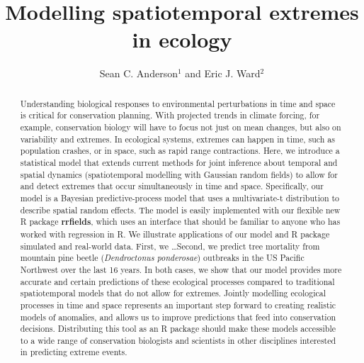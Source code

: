 \documentclass[12pt,english]{article}
\title{Modelling spatiotemporal extremes in ecology}
\author{
Sean C. Anderson$^1$ and
Eric J. Ward$^2$
}
\date{}
\begin{document}
\maketitle

\begin{spacing}{1.25}


\begin{abstract}

Understanding biological responses to environmental perturbations in time and
space is critical for conservation planning. With projected trends in climate
forcing, for example, conservation biology will have to focus not just on mean
changes, but also on variability and extremes. In ecological systems, extremes
can happen in time, such as population crashes, or in space, such as rapid
range contractions. Here, we introduce a statistical model that extends current
methods for joint inference about temporal and spatial dynamics (spatiotemporal
modelling with Gaussian random fields) to allow for and detect extremes that
occur simultaneously in time and space. Specifically, our model is a Bayesian
predictive-process model that uses a multivariate-t distribution to describe
spatial random effects. The model is easily implemented with our flexible new R
package \textbf{rrfields}, which uses an interface that should be familiar to
anyone who has worked with regression in R. We illustrate applications of our
model and R package simulated and real-world data. First, we \ldots Second, we
predict tree mortality from mountain pine beetle (\emph{Dendroctonus
  ponderosae}) outbreaks in the US Pacific Northwest over the last 16 years. In
both cases, we show that our model provides more accurate and certain
predictions of these ecological processes compared to traditional
spatiotemporal models that do not allow for extremes. Jointly modelling
ecological processes in time and space represents an important step forward to
creating realistic models of anomalies, and allows us to improve predictions
that feed into conservation decisions. Distributing this tool as an R package
should make these models accessible to a wide range of conservation biologists
and scientists in other disciplines interested in predicting extreme events.
\end{abstract}


\end{spacing}
\end{document}
